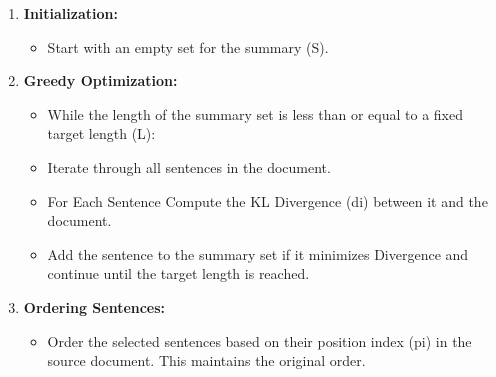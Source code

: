 \documentclass{ieeeaccess}
\begin{document}
\begin{enumerate}
    \item \textbf{Initialization:}
    \begin{itemize}
        \item Start with an empty set for the summary (S).
    \end{itemize}
    
    \item \textbf{Greedy Optimization:}
    \begin{itemize}
        \item While the length of the summary set is less than or equal to a fixed target length (L):
        \item Iterate through all sentences in the document.
        \item For Each Sentence Compute the KL Divergence (di) between it and the document.
        \item Add the sentence to the summary set if it minimizes Divergence and continue until the target length is reached.
    \end{itemize}
    
    \item \textbf{Ordering Sentences:}
    \begin{itemize}
        \item Order the selected sentences based on their position index (pi) in the source document. This maintains the original order.
    \end{itemize}
\end{enumerate}
\end{document}
